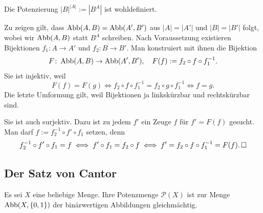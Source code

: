 \begin{Satz}
Die Potenzierung $|B|^{|A|} := |B^A|$ ist wohldefiniert.
\end{Satz}
\begin{Beweis}
Zu zeigen gilt, dass $\operatorname{Abb}(A,B)=\operatorname{Abb}(A',B')$ aus $|A|=|A'|$
und $|B|=|B'|$ folgt, wobei wir $\operatorname{Abb}(A,B)$ statt $B^A$ schreiben.
Nach Voraussetzung existieren Bijektionen $f_1\colon A\to A'$
und $f_2\colon B\to B'$. Man konstruiert mit ihnen die Bijektion
\[F\colon \operatorname{Abb}(A,B)\to\operatorname{Abb}(A',B'),\quad F(f) := f_2\circ f\circ f_1^{-1}.\]
Sie ist injektiv, weil
\[F(f) = F(g) \iff f_2\circ f\circ f_1^{-1} = f_2\circ g\circ f_1^{-1} \iff f = g.\]
Die letzte Umformung gilt, weil Bijektionen ja linkskürzbar und
rechtskürzbar sind.

Sie ist auch surjektiv. Dazu ist zu jedem $f'$ ein Zeuge $f$ für $f' = F(f)$
gesucht. Man darf $f := f_2^{-1}\circ f'\circ f_1$ setzen, denn
\[f_2^{-1}\circ f'\circ f_1  = f\iff  f'\circ f_1 = f_2\circ f
\iff f' = f_2\circ f\circ f_1^{-1} = F(f).\,\Box\]
\end{Beweis}

\subsection{Der Satz von Cantor}

\begin{Satz}
Es sei $X$ eine beliebige Menge. Ihre Potenzmenge $\mathcal P(X)$ ist
zur Menge $\operatorname{Abb}(X,\{0,1\})$ der binärwertigen Abbildungen gleichmächtig.
\end{Satz}

